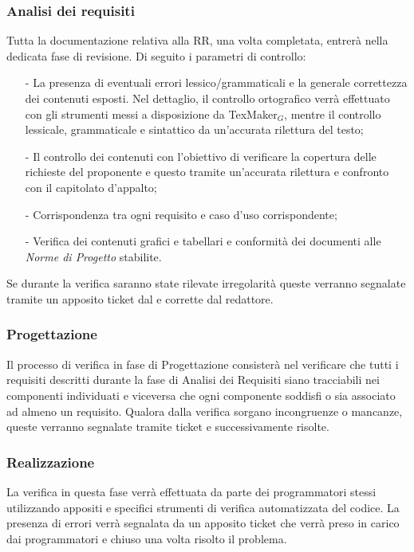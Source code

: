\subsubsection{Analisi dei requisiti}
Tutta la documentazione relativa alla RR, una volta completata, entrerà nella dedicata fase di revisione. Di seguito i parametri di controllo:
\begin{itemize}
	\item[-] La presenza di eventuali errori lessico/grammaticali e la generale correttezza dei contenuti esposti. Nel dettaglio, il controllo ortografico verrà effettuato con gli strumenti messi a disposizione da TexMaker$_G$, mentre il controllo lessicale, grammaticale e sintattico da un'accurata rilettura del testo;
	\item[-]Il controllo dei contenuti con l'obiettivo di verificare la copertura delle richieste del proponente e questo tramite un'accurata rilettura e confronto con il capitolato d'appalto;
	\item[-]Corrispondenza tra ogni requisito e caso d'uso corrispondente;
	\item[-]Verifica dei contenuti grafici e tabellari e conformità dei documenti alle \textit{Norme di Progetto} stabilite.
\end{itemize}
Se durante la verifica saranno state rilevate irregolarità
queste verranno segnalate tramite un apposito ticket dal \ruoloVerificatore
e corrette dal redattore.

\subsubsection{Progettazione}
Il processo di verifica in fase di Progettazione consisterà nel verificare che tutti i requisiti descritti durante la fase di Analisi dei Requisiti siano tracciabili nei componenti individuati e viceversa che ogni componente soddisfi o sia associato ad almeno un requisito. Qualora dalla verifica sorgano incongruenze o mancanze, queste verranno segnalate tramite ticket e successivamente risolte.

\subsubsection{Realizzazione}
La verifica in questa fase verrà effettuata da parte
dei programmatori stessi utilizzando appositi e specifici strumenti di
verifica automatizzata del codice. La presenza di errori verrà segnalata da
un apposito ticket che verrà preso in carico dai programmatori e chiuso
una volta risolto il problema.

